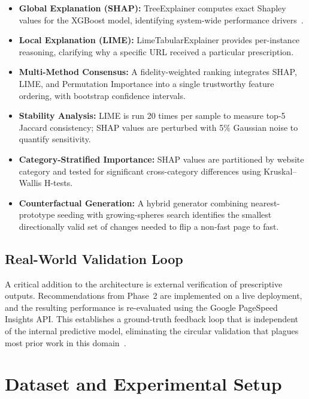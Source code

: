 \documentclass[sn-nature]{sn-jnl}
\begin{document}
\begin{itemize}
    \item \textbf{Global Explanation (SHAP):} TreeExplainer computes exact Shapley values for the XGBoost model, identifying system-wide performance drivers~\cite{salih2024}.

    \item \textbf{Local Explanation (LIME):} LimeTabularExplainer provides per-instance reasoning, clarifying why a specific URL received a particular prescription.

    \item \textbf{Multi-Method Consensus:} A fidelity-weighted ranking integrates SHAP, LIME, and Permutation Importance into a single trustworthy feature ordering, with bootstrap confidence intervals.

    \item \textbf{Stability Analysis:} LIME is run 20 times per sample to measure top-5 Jaccard consistency; SHAP values are perturbed with 5\% Gaussian noise to quantify sensitivity.

    \item \textbf{Category-Stratified Importance:} SHAP values are partitioned by website category and tested for significant cross-category differences using Kruskal--Wallis H-tests.

    \item \textbf{Counterfactual Generation:} A hybrid generator combining nearest-prototype seeding with growing-spheres search identifies the smallest directionally valid set of changes needed to flip a non-fast page to fast.
\end{itemize}

\subsection{Real-World Validation Loop}

A critical addition to the architecture is external verification of prescriptive outputs. Recommendations from Phase~2 are implemented on a live deployment, and the resulting performance is re-evaluated using the Google PageSpeed Insights API. This establishes a ground-truth feedback loop that is independent of the internal predictive model, eliminating the circular validation that plagues most prior work in this domain~\cite{vanriet2023}.


\section{Dataset and Experimental Setup}\label{sec5}
\end{document}

